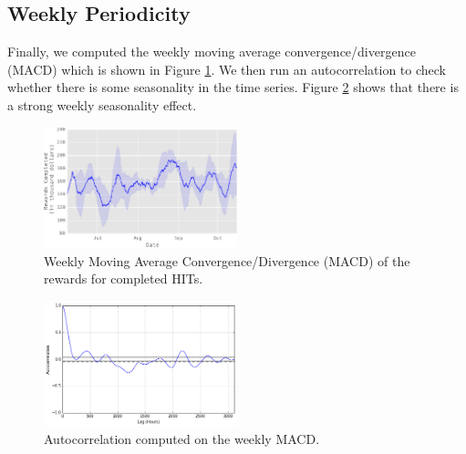 \subsection{Weekly Periodicity}
Finally, we computed the weekly moving average convergence/divergence (MACD) which is shown in Figure \ref{fig:mac}. We then run an autocorrelation to check whether there is some seasonality in the time series. Figure \ref{fig:autocorrelation2} shows that there is a strong weekly seasonality effect.
\begin{figure}[tb]
	\centering
		\includegraphics[width=0.5\textwidth]{figures/mac}
	\caption{Weekly Moving Average Convergence/Divergence (MACD) of the rewards for completed HITs.}
	\label{fig:mac}
\end{figure}
\begin{figure}[tb]
	\centering
		\includegraphics[width=0.5\textwidth]{figures/autocorrelation2}
	\caption{Autocorrelation computed on the weekly MACD.}
	\label{fig:autocorrelation2}
\end{figure}